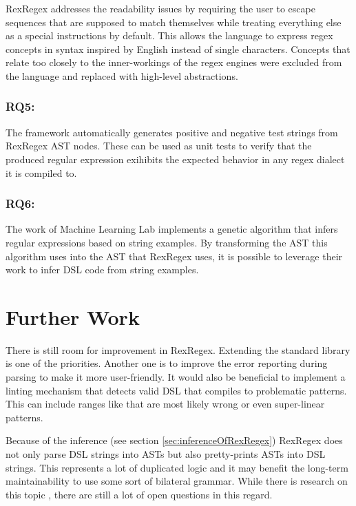 RexRegex addresses the readability issues by requiring the user to escape sequences that are supposed to match themselves while treating everything else as a special instructions by default. This allows the language to express regex concepts in syntax inspired by English instead of single characters. Concepts that relate too closely to the inner-workings of the regex engines were excluded from the language and replaced with high-level abstractions.

\subsubsection{RQ5: \RQfive}

The \utgast{} framework automatically generates positive and negative test strings from RexRegex AST nodes. These can be used as unit tests to verify that the produced regular expression exihibits the expected behavior in any regex dialect it is compiled to.

\subsubsection{RQ6: \RQsix}

The work of Machine Learning Lab implements a genetic algorithm that infers regular expressions based on string examples. By transforming the AST this algorithm uses into the AST that RexRegex uses, it is possible to leverage their work to infer DSL code from string examples.

\section{Further Work}

There is still room for improvement in RexRegex. Extending the standard library is one of the priorities. Another one is to improve the error reporting during parsing to make it more user-friendly. It would also be beneficial to implement a linting mechanism that detects valid DSL that compiles to problematic patterns. This can include ranges like  that are most likely wrong or even super-linear patterns.

Because of the inference (see section \ref{sec:inferenceOfRexRegex}) RexRegex does not only parse DSL strings into ASTs but also pretty-prints ASTs into DSL strings. This represents a lot of duplicated logic and it may benefit the long-term maintainability to use some sort of bilateral grammar. While there is research on this topic \cite{BidirectionalGrammarsForMachineCode}\cite{GuidedGrammarConvergence}, there are still a lot of open questions in this regard.

